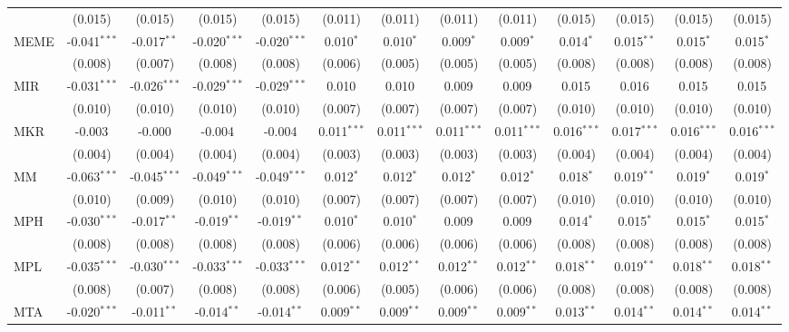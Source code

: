 \begin{table}[!htbp]
\begin{tabular}{@{\extracolsep{5pt}}lcccccccccccc}
  & (0.015) & (0.015) & (0.015) & (0.015) & (0.011) & (0.011) & (0.011) & (0.011) & (0.015) & (0.015) & (0.015) & (0.015) \\
 MEME & -0.041$^{***}$ & -0.017$^{**}$ & -0.020$^{***}$ & -0.020$^{***}$ & 0.010$^{*}$ & 0.010$^{*}$ & 0.009$^{*}$ & 0.009$^{*}$ & 0.014$^{*}$ & 0.015$^{**}$ & 0.015$^{*}$ & 0.015$^{*}$ \\
  & (0.008) & (0.007) & (0.008) & (0.008) & (0.006) & (0.005) & (0.005) & (0.005) & (0.008) & (0.008) & (0.008) & (0.008) \\
 MIR & -0.031$^{***}$ & -0.026$^{***}$ & -0.029$^{***}$ & -0.029$^{***}$ & 0.010$^{}$ & 0.010$^{}$ & 0.009$^{}$ & 0.009$^{}$ & 0.015$^{}$ & 0.016$^{}$ & 0.015$^{}$ & 0.015$^{}$ \\
  & (0.010) & (0.010) & (0.010) & (0.010) & (0.007) & (0.007) & (0.007) & (0.007) & (0.010) & (0.010) & (0.010) & (0.010) \\
 MKR & -0.003$^{}$ & -0.000$^{}$ & -0.004$^{}$ & -0.004$^{}$ & 0.011$^{***}$ & 0.011$^{***}$ & 0.011$^{***}$ & 0.011$^{***}$ & 0.016$^{***}$ & 0.017$^{***}$ & 0.016$^{***}$ & 0.016$^{***}$ \\
  & (0.004) & (0.004) & (0.004) & (0.004) & (0.003) & (0.003) & (0.003) & (0.003) & (0.004) & (0.004) & (0.004) & (0.004) \\
 MM & -0.063$^{***}$ & -0.045$^{***}$ & -0.049$^{***}$ & -0.049$^{***}$ & 0.012$^{*}$ & 0.012$^{*}$ & 0.012$^{*}$ & 0.012$^{*}$ & 0.018$^{*}$ & 0.019$^{**}$ & 0.019$^{*}$ & 0.019$^{*}$ \\
  & (0.010) & (0.009) & (0.010) & (0.010) & (0.007) & (0.007) & (0.007) & (0.007) & (0.010) & (0.010) & (0.010) & (0.010) \\
 MPH & -0.030$^{***}$ & -0.017$^{**}$ & -0.019$^{**}$ & -0.019$^{**}$ & 0.010$^{*}$ & 0.010$^{*}$ & 0.009$^{}$ & 0.009$^{}$ & 0.014$^{*}$ & 0.015$^{*}$ & 0.015$^{*}$ & 0.015$^{*}$ \\
  & (0.008) & (0.008) & (0.008) & (0.008) & (0.006) & (0.006) & (0.006) & (0.006) & (0.008) & (0.008) & (0.008) & (0.008) \\
 MPL & -0.035$^{***}$ & -0.030$^{***}$ & -0.033$^{***}$ & -0.033$^{***}$ & 0.012$^{**}$ & 0.012$^{**}$ & 0.012$^{**}$ & 0.012$^{**}$ & 0.018$^{**}$ & 0.019$^{**}$ & 0.018$^{**}$ & 0.018$^{**}$ \\
  & (0.008) & (0.007) & (0.008) & (0.008) & (0.006) & (0.005) & (0.006) & (0.006) & (0.008) & (0.008) & (0.008) & (0.008) \\
 MTA & -0.020$^{***}$ & -0.011$^{**}$ & -0.014$^{**}$ & -0.014$^{**}$ & 0.009$^{**}$ & 0.009$^{**}$ & 0.009$^{**}$ & 0.009$^{**}$ & 0.013$^{**}$ & 0.014$^{**}$ & 0.014$^{**}$ & 0.014$^{**}$ \\

\end{tabular}
\end{table}
